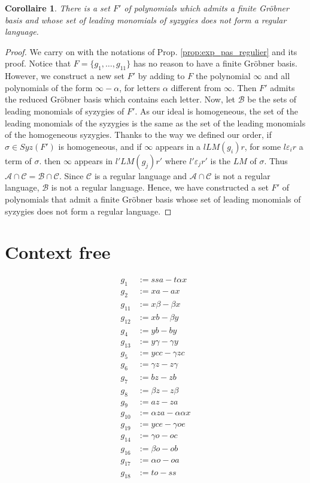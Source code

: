 \documentclass[sigconf]{acmart}
\theoremstyle{plain}
\newtheorem{cor}[lem]{Corollaire}
\theoremstyle{definition}
\theoremstyle{remark}
\newcommand{\LM}{LM}
\begin{document}
\begin{cor}
There is a set $F'$ of polynomials which
admits a finite Gröbner basis
and whose set of leading monomials of syzygies does not form a regular language. 
\end{cor}
\begin{proof}
We carry on with the notations of Prop. \ref{prop:exp_pas_regulier} and
its proof.
Notice that $F=\{g_1,\dots,g_{11}\}$ has no reason to have a finite Gröbner basis. However, we construct a new set $F'$ by adding to $F$ the polynomial $\infty$ and all polynomials of the form $\infty-\alpha$, for letters $\alpha$ different from $\infty$. Then $F'$ admits the reduced Gröbner basis which contains each letter.
Now, let $\mathscr{B}$ be the sets of leading monomials of syzygies of $F'$.
As our ideal is homogeneous,
the set of the
leading monomials of the syzygies
is the same as the set of the leading
monomials of the homogeneous syzygies.
Thanks to the way we defined our order,
if $\sigma \in Syz(F')$ is homogeneous,
and
if $\infty$ appears in a $l \LM(g_i) r$,
for some $l \varepsilon_i r$ 
a term of $\sigma.$ 
then 
$\infty$ appears in $l' \LM(g_j) r'$
where $l' \varepsilon_j r'$ is the $\LM$
of $\sigma.$
Thus $\mathscr{A} \cap \mathscr{C}=\mathscr{B} \cap \mathscr{C}$. Since $\mathscr{C}$ is a regular language and $\mathscr{A} \cap \mathscr{C}$ is not a regular language, $\mathscr{B}$ is not a regular language. Hence, we have constructed a set $F'$ of polynomials that admit a finite Gröbner basis whose set of leading monomials of syzygies does not form a regular language. 
\end{proof}


\section{Context free}

\begin{align*}
g_1 & := ssa - t\alpha x \\ 
g_2 & := xa - ax \\ 
g_{11} & := x\beta-\beta x\\ 
g_{12} & := xb-\beta y \\ 
g_4 & := yb-by\\ 
g_{13} & := y\gamma-\gamma y \\
g_5 & := ycc-\gamma zc \\ 
g_6 & :=  \gamma z-z\gamma\\ 
g_7 & := bz-zb \\
g_8 & := \beta z-z\beta \\
g_9 & := az-za \\ 
g_{10} & := \alpha za-\alpha\alpha x  \\ 
g_{19} & := yce - \gamma oe \\
g_{14} & := \gamma o-oc \\
g_{16} & := \beta o-ob \\ 
g_{17} & := \alpha o-oa \\ 
g_{18} & := to-ss
\end{align*}
\end{document}
